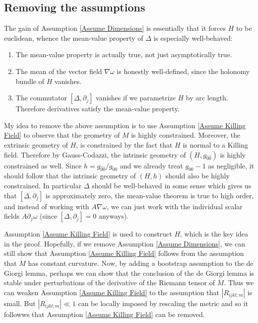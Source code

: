 \documentclass[reqno,12pt,letterpaper]{amsart}
\theoremstyle{definition}
\numberwithin{equation}{section}
\begin{document}
\subsection{Removing the assumptions}
The gain of Assumption \ref{Assume Dimensions} is essentially that it forces $H$ to be euclidean, whence the mean-value property of $\Delta$ is especially well-behaved:

\begin{enumerate}
\item The mean-value property is actually true, not just asymptotically true.
\item The mean of the vector field $\nabla \omega$ is honestly well-defined, since the holonomy bundle of $H$ vanishes.
\item The commutator $[\Delta, \partial_j]$ vanishes if we parametrize $H$ by arc length. Therefore derivatives satisfy the mean-value property.
\end{enumerate}

My idea to remove the above assumption is to use Assumption \ref{Assume Killing Field} to observe that the geometry of $M$ is highly constrained.
Moreover, the extrinsic geometry of $H$, is constrained by the fact that $H$ is normal to a Killing field.
Therefore by Gauss-Codazzi, the intrinsic geometry of $(H, g_{\hat 0 \hat 0})$ is highly constrained as well.
Since $h = g_{\hat 0 \hat 0}/g_{00}$ and we already treat $g_{00} - 1$ as negligible, it should follow that the intrinsic geometry of $(H, h)$ should also be highly constrained.
In particular $\Delta$ should be well-behaved in some sense which gives us that $[\Delta, \partial_j]$ is approximately zero, the mean-value theorem is true to high order, and instead of working with $A\nabla \omega$, we can just work with the individual scalar fields $A\partial_j \omega$ (since $[\Delta, \partial_j] = 0$ anyways).

Assumption \ref{Assume Killing Field} is used to construct $H$, which is the key idea in the proof.
Hopefully, if we remove Assumption \ref{Assume Dimensions}, we can still show that Assumption \ref{Assume Killing Field} follows from the assumption that $M$ has constant curvature.
Now, by adding a bootstrap assumption to the de Giorgi lemma, perhaps we can show that the conclusion of the de Giorgi lemma is stable under perturbations of the derivative of the Riemann tensor of $M$.
Thus we can weaken Assumption \ref{Assume Killing Field} to the assumption that $|R_{ijkl;m}|$ is small.
But $|R_{ijkl;m}| \ll 1$ can be locally imposed by rescaling the metric and so it followws that Assumption \ref{Assume Killing Field} can be removed.
\end{document}

